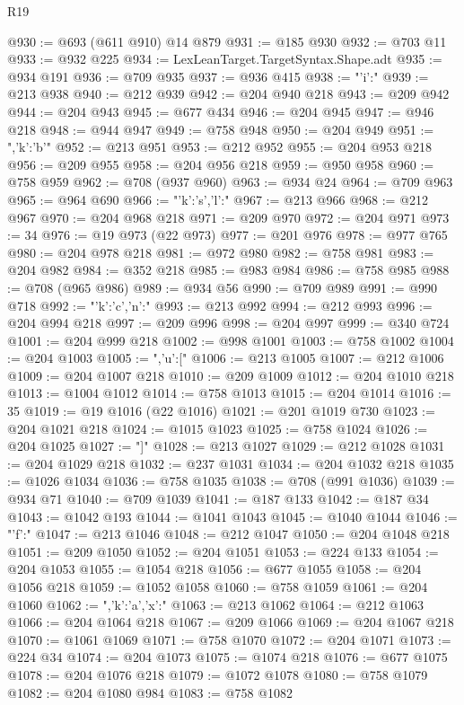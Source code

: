 \begin{lexlean}{R19}
\begin{coremodule}
@930 := @693 (@611 @910) @14 @879
@931 := @185 @930
@932 := @703 @11
@933 := @932 @225
@934 := LexLeanTarget.TargetSyntax.Shape.adt
@935 := @934 @191
@936 := @709 @935
@937 := @936 @415
@938 := "{'i':"
@939 := @213 @938
@940 := @212 @939
@942 := @204 @940 @218
@943 := @209 @942
@944 := @204 @943
@945 := @677 @434
@946 := @204 @945
@947 := @946 @218
@948 := @944 @947
@949 := @758 @948
@950 := @204 @949
@951 := ",'k':'b'}"
@952 := @213 @951
@953 := @212 @952
@955 := @204 @953 @218
@956 := @209 @955
@958 := @204 @956 @218
@959 := @950 @958
@960 := @758 @959
@962 := @708 (@937 @960)
@963 := @934 @24
@964 := @709 @963
@965 := @964 @690
@966 := "{'k':'s','l':"
@967 := @213 @966
@968 := @212 @967
@970 := @204 @968 @218
@971 := @209 @970
@972 := @204 @971
@973 := 34
@976 := @19 @973 (@22 @973)
@977 := @201 @976
@978 := @977 @765
@980 := @204 @978 @218
@981 := @972 @980
@982 := @758 @981
@983 := @204 @982
@984 := @352 @218
@985 := @983 @984
@986 := @758 @985
@988 := @708 (@965 @986)
@989 := @934 @56
@990 := @709 @989
@991 := @990 @718
@992 := "{'k':'c','n':"
@993 := @213 @992
@994 := @212 @993
@996 := @204 @994 @218
@997 := @209 @996
@998 := @204 @997
@999 := @340 @724
@1001 := @204 @999 @218
@1002 := @998 @1001
@1003 := @758 @1002
@1004 := @204 @1003
@1005 := ",'u':["
@1006 := @213 @1005
@1007 := @212 @1006
@1009 := @204 @1007 @218
@1010 := @209 @1009
@1012 := @204 @1010 @218
@1013 := @1004 @1012
@1014 := @758 @1013
@1015 := @204 @1014
@1016 := 35
@1019 := @19 @1016 (@22 @1016)
@1021 := @201 @1019 @730
@1023 := @204 @1021 @218
@1024 := @1015 @1023
@1025 := @758 @1024
@1026 := @204 @1025
@1027 := "]}"
@1028 := @213 @1027
@1029 := @212 @1028
@1031 := @204 @1029 @218
@1032 := @237 @1031
@1034 := @204 @1032 @218
@1035 := @1026 @1034
@1036 := @758 @1035
@1038 := @708 (@991 @1036)
@1039 := @934 @71
@1040 := @709 @1039
@1041 := @187 @133
@1042 := @187 @34
@1043 := @1042 @193
@1044 := @1041 @1043
@1045 := @1040 @1044
@1046 := "{'f':"
@1047 := @213 @1046
@1048 := @212 @1047
@1050 := @204 @1048 @218
@1051 := @209 @1050
@1052 := @204 @1051
@1053 := @224 @133
@1054 := @204 @1053
@1055 := @1054 @218
@1056 := @677 @1055
@1058 := @204 @1056 @218
@1059 := @1052 @1058
@1060 := @758 @1059
@1061 := @204 @1060
@1062 := ",'k':'a','x':"
@1063 := @213 @1062
@1064 := @212 @1063
@1066 := @204 @1064 @218
@1067 := @209 @1066
@1069 := @204 @1067 @218
@1070 := @1061 @1069
@1071 := @758 @1070
@1072 := @204 @1071
@1073 := @224 @34
@1074 := @204 @1073
@1075 := @1074 @218
@1076 := @677 @1075
@1078 := @204 @1076 @218
@1079 := @1072 @1078
@1080 := @758 @1079
@1082 := @204 @1080 @984
@1083 := @758 @1082
}}
\end{coremodule}
\end{lexlean}

